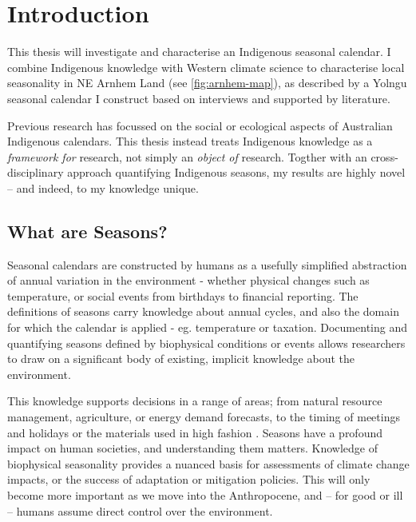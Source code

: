 \chapter{Introduction}
\label{ch:introduction}


This thesis will investigate and characterise an Indigenous seasonal calendar.
I combine Indigenous knowledge with Western climate science to characterise
local seasonality in NE Arnhem Land (see \cref{fig:arnhem-map}),
as described by a Yolngu seasonal calendar I construct based on
interviews and supported by literature.

Previous research  has focussed on the social or ecological aspects of Australian
Indigenous calendars.  This thesis instead treats Indigenous knowledge as a
\emph{framework for} research, not simply an \emph{object of} research.
Togther with an cross-disciplinary approach quantifying Indigenous seasons,
my results are highly novel -- and indeed, to my knowledge unique.



\section{What are Seasons?}

Seasonal calendars are constructed by humans as a usefully simplified
abstraction of annual variation in the environment - whether physical
changes such as temperature, or social events from birthdays to financial
reporting.  The definitions of seasons carry knowledge about annual cycles,
and also the domain for which the calendar is applied - eg. temperature
or taxation.
%
Documenting and quantifying seasons defined by biophysical conditions
or events allows researchers to draw on a significant body of existing,
implicit knowledge about the environment.

This knowledge supports decisions in a range of areas; from natural
resource management, agriculture, or energy demand forecasts, to
the timing of meetings and holidays or the materials used in high fashion .
Seasons have a profound impact on human societies, and understanding
them matters.  Knowledge of biophysical seasonality provides a nuanced
basis for assessments of climate change impacts, or the success of
adaptation or mitigation policies.  This will only become more important
as we move into the Anthropocene, and -- for good or ill -- humans assume
direct control over the environment.


